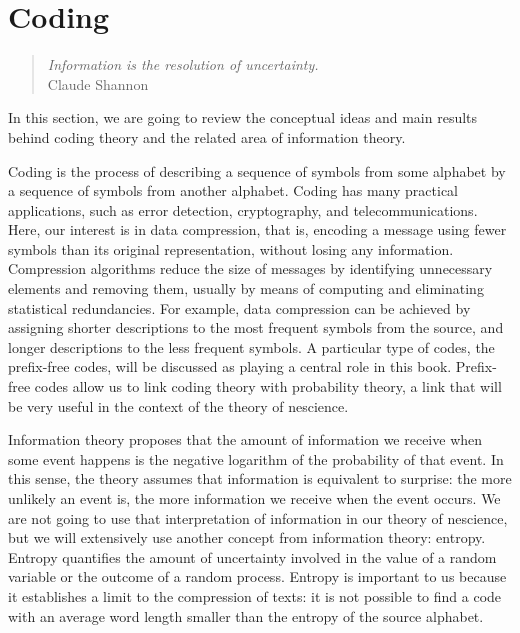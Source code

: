 %
%


\chapter{Coding}
\label{chap:Coding}

\begin{quote}
\begin{flushright}
\emph{Information is the resolution of uncertainty.}\\
Claude Shannon
\end{flushright}
\end{quote}
\bigskip

In this section, we are going to review the conceptual ideas and main results behind coding theory and the related area of information theory.

Coding is the process of describing a sequence of symbols from some alphabet by a sequence of symbols from another alphabet. Coding has many practical applications, such as error detection, cryptography, and telecommunications. Here, our interest is in data compression, that is, encoding a message using fewer symbols than its original representation, without losing any information. Compression algorithms reduce the size of messages by identifying unnecessary elements and removing them, usually by means of computing and eliminating statistical redundancies. For example, data compression can be achieved by assigning shorter descriptions to the most frequent symbols from the source, and longer descriptions to the less frequent symbols. A particular type of codes, the prefix-free codes, will be discussed as playing a central role in this book. Prefix-free codes allow us to link coding theory with probability theory, a link that will be very useful in the context of the theory of nescience.

Information theory proposes that the amount of information we receive when some event happens is the negative logarithm of the probability of that event. In this sense, the theory assumes that information is equivalent to surprise: the more unlikely an event is, the more information we receive when the event occurs. We are not going to use that interpretation of information in our theory of nescience, but we will extensively use another concept from information theory: entropy. Entropy quantifies the amount of uncertainty involved in the value of a random variable or the outcome of a random process. Entropy is important to us because it establishes a limit to the compression of texts: it is not possible to find a code with an average word length smaller than the entropy of the source alphabet.

